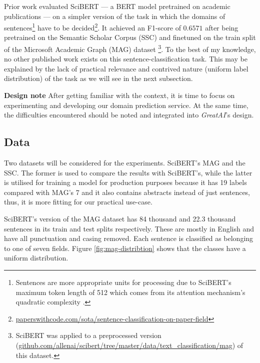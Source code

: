 Prior work evaluated SciBERT \cite{beltagy2019scibert} --- a BERT \cite{devlin2018bert} model pretrained on academic publications --- on a simpler version of the task in which the domains of sentences\footnote{Sentences are more appropriate units for processing due to SciBERT's maximum token length of 512 which comes from its attention mechanism's quadratic complexity \cite{vaswani2017attention}.} have to be decided\footnote{\href{https://paperswithcode.com/sota/sentence-classification-on-paper-field}{paperswithcode.com/sota/sentence-classification-on-paper-field}}. It achieved an F1-score of $0.6571$ after being pretrained on the Semantic Scholar Corpus (SSC) \cite{Lo2020S2ORCTS} and finetuned on the train split of the Microsoft Academic Graph (MAG) dataset \cite{wang2019review}\footnote{SciBERT was applied to a preprocessed version (\href{https://github.com/allenai/scibert/tree/master/data/text_classification/mag}{github.com/allenai/scibert/tree/master/data/text\_classification/mag}) of this dataset.}. To the best of my knowledge, no other published work exists on this sentence-classification task. This may be explained by the lack of practical relevance and contrived nature (uniform label distribution) of the task as we will see in the next subsection.

\begin{displayquote}
\textbf{Design note} After getting familiar with the context, it is time to focus on experimenting and developing our domain prediction service. At the same time, the difficulties encountered should be noted and integrated into \textit{GreatAI}'s design.
\end{displayquote}

\subsection{Data}

Two datasets will be considered for the experiments. SciBERT's MAG and the SSC. The former is used to compare the results with SciBERT's, while the latter is utilised for training a model for production purposes because it has 19 labels compared with MAG's 7 and it also contains abstracts instead of just sentences, thus, it is more fitting for our practical use-case.

SciBERT's version of the MAG dataset has 84 thousand and 22.3 thousand sentences in its train and test splits respectively. These are mostly in English and have all punctuation and casing removed. Each sentence is classified as belonging to one of seven fields. Figure \ref{fig:mag-distribtion} shows that the classes have a uniform distribution. 

